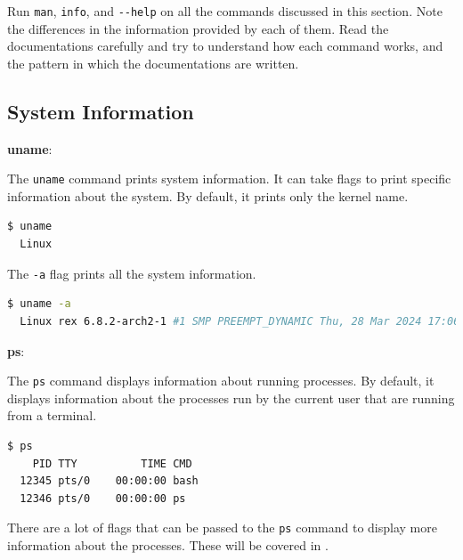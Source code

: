 \begin{exercise}
  Run \texttt{man}, \texttt{info}, and \texttt{-{}-help} on all the commands discussed in this section.
  Note the differences in the information provided by each of them.
  Read the documentations carefully and try to understand how each command works, and the pattern in which the documentations are written.
\end{exercise}

\subsection{System Information}

\textbf{uname}:

The \texttt{uname} command prints system information.
It can take flags to print specific information about the system.
By default, it prints only the kernel name.

\begin{lstlisting}[language=bash]
  $ uname
  Linux
\end{lstlisting}

The \texttt{-a} flag prints all the system information.

\begin{lstlisting}[language=bash]
  $ uname -a
  Linux rex 6.8.2-arch2-1 #1 SMP PREEMPT_DYNAMIC Thu, 28 Mar 2024 17:06:35 +0000 x86_64 GNU/Linux
\end{lstlisting}

\textbf{ps}:

The \texttt{ps} command displays information about running processes.
By default, it displays information about the processes run by the current user that are running from a terminal.

\begin{lstlisting}[language=bash]
  $ ps
    PID TTY          TIME CMD
  12345 pts/0    00:00:00 bash
  12346 pts/0    00:00:00 ps
\end{lstlisting}

There are a lot of flags that can be passed to the \texttt{ps} command to display more information about the processes. These will be covered in .

